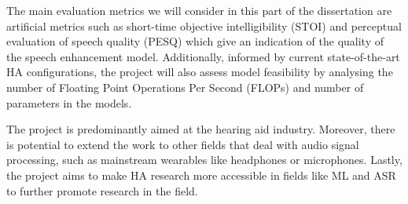 \documentclass[logo,bsc,singlespacing,parskip,online]{infthesis}
\begin{document}
The main evaluation metrics we will consider in this part of the dissertation 
are artificial metrics such as short-time objective intelligibility (STOI) and perceptual evaluation of speech quality (PESQ) 
which give an indication of the quality of the speech enhancement model.
Additionally, informed by current state-of-the-art HA configurations, the project will also assess model feasibility by analysing the number of Floating Point Operations Per Second (FLOPs) and number of parameters
in the models.

The project is predominantly aimed at the hearing aid industry. 
Moreover, there is potential to extend the work to other fields that deal with audio signal processing,
such as mainstream wearables like headphones or microphones. Lastly, the project aims to make HA research more accessible 
in fields like ML and ASR to further promote research in the field.
\end{document}
